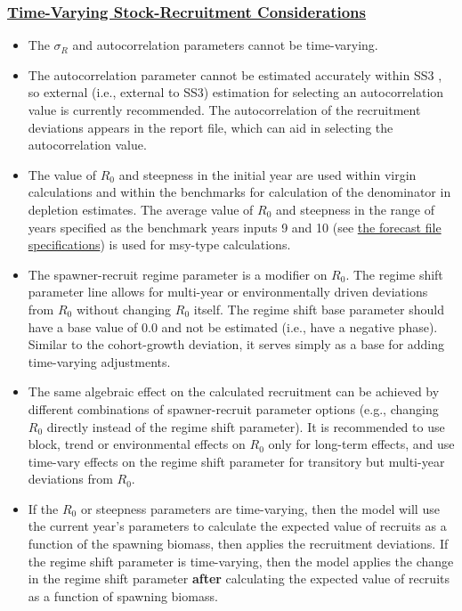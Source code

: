 \subsubsection[Time-Varying Stock-Recruitment Considerations]{\protect\hyperlink{tv-sr}{Time-Varying Stock-Recruitment Considerations}}
\begin{itemize}
	
	\item The $\sigma_R$ and autocorrelation parameters cannot be time-varying. 
	
	\item The autocorrelation parameter cannot be estimated accurately within SS3 \citep{johnson-can-2016}, so external (i.e., external to SS3) estimation for selecting an autocorrelation value is currently recommended. The autocorrelation of the recruitment deviations appears in the report file, which can aid in selecting the autocorrelation value.
		
	\item The value of $R_{0}$ and steepness in the initial year are used within virgin calculations and within the benchmarks for calculation of the denominator in depletion estimates. The average value of $R_{0}$ and steepness in the range of years specified as the benchmark years inputs 9 and 10 (see \hyperlink{fore-specify}{the forecast file specifications}) is used for \gls{msy}-type calculations. 
	
	\item The spawner-recruit regime parameter is a modifier on $R_{0}$. The regime shift parameter line allows for multi-year or environmentally driven deviations from $R_{0}$ without changing $R_{0}$ itself. The regime shift base parameter should have a base value of 0.0 and not be estimated (i.e., have a negative phase). Similar to the cohort-growth deviation, it serves simply as a base for adding time-varying adjustments.
	
	\item The same algebraic effect on the calculated recruitment can be achieved by different combinations of spawner-recruit parameter options (e.g., changing $R_{0}$ directly instead of the regime shift parameter). It is recommended to use block, trend or environmental effects on $R_{0}$ only for long-term effects, and use time-vary effects on the regime shift parameter for transitory but multi-year deviations from $R_{0}$.	
	
	\item If the $R_{0}$ or steepness parameters are time-varying, then the model will use the current year's parameters to calculate the expected value of recruits as a function of the spawning biomass, then applies the recruitment deviations. If the regime shift parameter is time-varying, then the model applies the change in the regime shift parameter \textbf{after} calculating the expected value of recruits as a function of spawning biomass.

\end{itemize}


